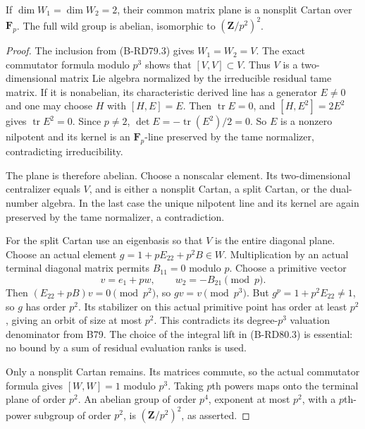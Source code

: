 \begin{lemma}
\label{lem:B-RD80-plane}
If \(\dim W_1=\dim W_2=2\), their common matrix plane is a
nonsplit Cartan over \(\mathbf F_p\). The full wild group is
abelian, isomorphic to \((\mathbf Z/p^2)^2\).
\end{lemma}
\begin{proof}
The inclusion from (B-RD79.3) gives \(W_1=W_2=V\).
The exact commutator formula modulo \(p^3\) shows that
\([V,V]\subset V\). Thus \(V\) is a two-dimensional matrix
Lie algebra normalized by the irreducible residual tame matrix.
If it is nonabelian, its characteristic derived line has a generator
\(E\ne0\) and one may choose \(H\) with \([H,E]=E\).
Then \(\operatorname{tr}E=0\), and
\([H,E^2]=2E^2\) gives \(\operatorname{tr}E^2=0\).
Since \(p\ne2\), \(\det E=-\operatorname{tr}(E^2)/2=0\).
So \(E\) is a nonzero nilpotent and its kernel is an
\(\mathbf F_p\)-line preserved by the tame normalizer,
contradicting irreducibility.

The plane is therefore abelian. Choose a nonscalar element.
Its two-dimensional centralizer equals \(V\), and is either
a nonsplit Cartan, a split Cartan, or the dual-number algebra.
In the last case the unique nilpotent line and its kernel are
again preserved by the tame normalizer, a contradiction.

For the split Cartan use an eigenbasis so that \(V\) is the
entire diagonal plane. Choose an actual element
\(g=1+pE_{22}+p^2B\in W\). Multiplication by an actual terminal
diagonal matrix permits \(B_{11}=0\) modulo \(p\).
Choose a primitive vector
\[
                 v=e_1+p w,\qquad w_2=-B_{21}\pmod p.
                                                     \tag{B-RD80.3}
\]
Then \((E_{22}+pB)v=0\pmod{p^2}\), so \(gv=v\pmod{p^3}\).
But \(g^p=1+p^2E_{22}\ne1\), so \(g\) has order \(p^2\).
Its stabilizer on this actual primitive point has order at least
\(p^2\), giving an orbit of size at most \(p^2\). This contradicts
its degree-\(p^3\) valuation denominator from B79.
The choice of the integral lift in (B-RD80.3) is essential: no
bound by a sum of residual evaluation ranks is used.

Only a nonsplit Cartan remains. Its matrices commute, so the
actual commutator formula gives \([W,W]=1\) modulo \(p^3\).
Taking \(p\)th powers maps onto the terminal plane of order
\(p^2\). An abelian group of order \(p^4\), exponent at most
\(p^2\), with a \(p\)th-power subgroup of order \(p^2\), is
\((\mathbf Z/p^2)^2\), as asserted.
\end{proof}

